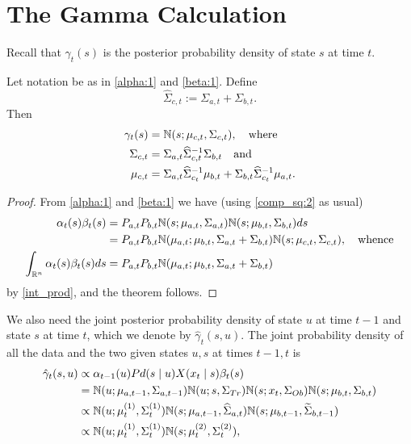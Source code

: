 \documentclass[12pt,leqno]{article}
\begin{document}
\section{The Gamma Calculation}
Recall that $\gamma_t(s)$ is the posterior probability density of state $s$
at time $t$. 
\begin{Thm}
  Let notation be as in \eqref{alpha:1} and \eqref{beta:1}.  Define
$$
  \widehat{\Sigma}_{c,t} := \Sigma_{a,t}+\Sigma_{b,t}.
  $$
  Then
  \begin{align*}
      \gamma_t(s) &= {\mathbb N}(s;\mu_{c,t},\Sigma_{c,t}),\quad\text{where}\\
      \Sigma_{c,t} &= \Sigma_{a,t}\widehat{\Sigma}_{c,t}^{-1}\Sigma_{b,t}
      \quad\text{and}\\
      \mu_{c,t} &= \Sigma_{a,t}\widehat{\Sigma}_{c_t}^{-1}\mu_{b,t} +
      \Sigma_{b,t}\widehat{\Sigma}_{c_t}^{-1}\mu_{a,t}.
  \end{align*}
\end{Thm}
\begin{proof}
  From \eqref{alpha:1} and \eqref{beta:1} we have (using \eqref{comp_sq:2}
  as usual)
  \begin{align*}
  \alpha_t(s)\beta_t(s) &= P_{a,t}P_{b,t}{\mathbb N}(s;\mu_{a,t},\Sigma_{a,t})
  {\mathbb N}(s;\mu_{b,t},\Sigma_{b,t})ds\\
  &= P_{a,t}P_{b,t}{\mathbb N}(\mu_{a,t};\mu_{b,t},\Sigma_{a,t}+\Sigma_{b,t}){\mathbb N}(s;\mu_{c,t},
  \Sigma_{c,t}), \quad\text{whence}\\
  \int_{{\mathbb R}^n}\alpha_t(s)\beta_t(s)ds &= P_{a,t}P_{b,t}{\mathbb N}(\mu_{a,t};\mu_{b,t},\Sigma_{a,t}+\Sigma_{b,t})
  \end{align*}
by \eqref{int_prod}, and the theorem follows.
\end{proof}
We also need the joint posterior probability density of state $u$ at time $t-1$ and state $s$ at time $t$,
which we denote by $\hat{\gamma}_t(s,u)$. The joint probability density of all the data and the two given states
  $u,s$  at times $t-1,t$ is
  \begin{align}
    \hat{\gamma}_t(s,u) &\propto \alpha_{t-1}(u)Pd(s\mid u)X(x_t\mid s)\beta_t(s) \notag\\
    &= {\mathbb N}(u;\mu_{a,t-1},\Sigma_{a,t-1}){\mathbb N}(u;s,\Sigma_{Tr})  {\mathbb N}(s;x_t,\Sigma_{Ob}){\mathbb N}(s;\mu_{b,t},\Sigma_{b,t})\notag\\
    &\propto {\mathbb N}(u;\mu^{(1)}_t,\Sigma^{(1)}_t){\mathbb N}(s;\mu_{a,t-1},\widehat{\Sigma}_{a,t}){\mathbb N}(s;\mu_{b,t-1},
    \widetilde{\Sigma}_{b,t-1})\notag\\
    &\propto {\mathbb N}(u;\mu^{(1)}_t,\Sigma^{(1)}_t){\mathbb N}(s;\mu^{(2)}_t,\Sigma^{(2)}_t),\label{gamma_hat}
  \end{align}
\end{document}
